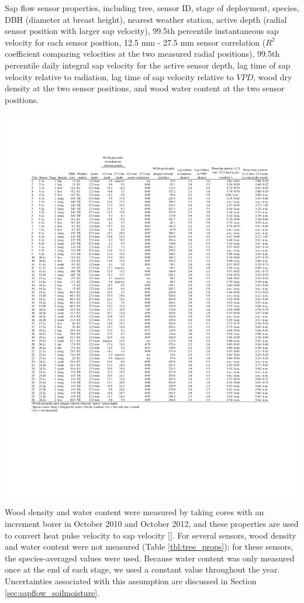\begin{table}
  \caption{Sap flow sensor properties, including tree, sensor ID, stage of deployment, species, DBH (diameter at breast height), nearest weather station, active depth (radial sensor position with larger sap velocity), 99.5th percentile instantaneous sap velocity for each sensor position, 12.5 mm - 27.5 mm sensor correlation ($R^2$ coefficient comparing velocities at the two measured radial positions), 99.5th percentile daily integral sap velocity for the active sensor depth, lag time of sap velocity relative to radiation, lag time of sap velocity relative to $VPD$, wood dry density at the two sensor positions, and wood water content at the two sensor positions.}
  \label{tbl:tree_props}
  \includegraphics[width=\linewidth]{ch1-sapflow/tables/Table1_cropped.pdf}
\end{table}

Wood density and water content were measured by taking cores with an increment borer in October 2010 and October 2012, and these properties are used to convert heat pulse velocity to sap velocity [\cite{burgess2001improved}].  For several sensors, wood density and water content were not measured (Table \ref{tbl:tree_props}); for these sensors, the species-averaged values were used.  Because water content was only measured once at the end of each stage, we used a constant value throughout the year.  Uncertainties associated with this assumption are discussed in Section \ref{sec:sapflow_soilmoisture}.

